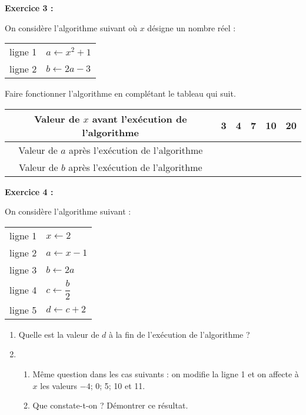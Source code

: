 \medskip

\noindent \textbf{Exercice 3 :}

On considère l'algorithme suivant où $ x $ désigne un nombre réel :

\medskip

\begin{center}
\begin{tabularx}{0.2\linewidth}{|c|X|}
\hline
ligne 1 & $ a \gets x^2+1 $ \\
ligne 2 & $ b \gets 2a-3 $ \\
\hline
\end{tabularx}
\end{center}

\medskip

Faire fonctionner l'algorithme en complétant le tableau qui suit.

\medskip

{\renewcommand{\tabularxcolumn}[1]{%
>{\centering\arraybackslash}m{#1}}
\begin{tabularx}{0.95\linewidth}{|c|X|X|X|X|X|}
\hline
Valeur de $ x $ avant l'exécution de l'algorithme & 3 & 4 & 7 & 10 & 20 \\
\hline
Valeur de $ a $ après l'exécution de l'algorithme & & & & & \\
\hline
Valeur de $ b $ après l'exécution de l'algorithme & & & & & \\
\hline
\end{tabularx}
}   

\medskip

\noindent \textbf{Exercice 4 :}

On considère l'algorithme suivant :

\medskip

\begin{center}
\begin{tabularx}{0.2\linewidth}{|c|X|}
\hline
ligne 1 & $ x \gets 2 $ \\
ligne 2 & $ a \gets x-1 $ \\
ligne 3 & $ b \gets 2a $ \\
ligne 4 & $ c \gets \dfrac{b}{2} $ \\
ligne 5 & $ d \gets c+2 $ \\
\hline
\end{tabularx}
\end{center}

\begin{enumerate}
\item Quelle est la valeur de $ d $ à la fin de l'exécution de l'algorithme ?
\item \begin{enumerate}
      \item Même question dans les cas suivants : on modifie la ligne 1 et on affecte à $ x $ les valeurs $ -4 $; 0; 5; 10 et 11.
      \item Que constate-t-on ? Démontrer ce résultat.
      \end{enumerate}
\end{enumerate}

